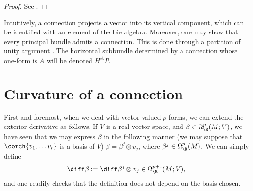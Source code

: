 \begin{proof}
    See \parencite[Prop. 28.5]{tu2017differential}.
\end{proof}
Intuitively, a connection projects a vector into its vertical component, which can be identified with an element of the Lie algebra. Moreover, one may show that every principal bundle admits a connection. This is done through a partition of unity argument \parencite[Prop. 1.3.7]{Rudolph_2017pug}. The horizontal subbundle determined by a connection whose one-form is \(A\) will be denoted \(H^AP\). 

\section{Curvature of a connection} \label{section_curvature_connection}
First and foremost, when we deal with vector-valued \(p\)-forms, we can extend the exterior derivative as follows. If \(V\) is a real vector space, and \(\beta\in \Omega^p_\R(M;V)\), we have seen that we may express \(\beta\) in the following manner (we may suppose that \(\corch{v_1, \ldots v_r}\) is a basis of \(V\)) \(\beta=\beta^j\otimes v_j\), where \(\beta^j \in \Omega^p_\R(M)\). We can simply define
\[
\diff \beta:= \diff \beta^j \otimes v_j\in \Omega_\R^{p+1}(M;V),
\]
and one readily checks that the definition does not depend on the basis chosen.

